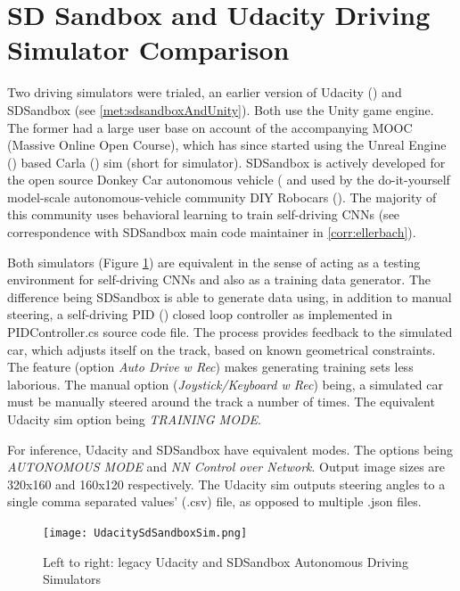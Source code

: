 
\section{SD Sandbox and Udacity Driving Simulator Comparison}

Two driving simulators were trialed, an earlier version of Udacity (\cite{UdacityCarSim}) and SDSandbox (see \ref{met:sdsandboxAndUnity}). Both use the Unity game engine. The former had a large user base on account of the accompanying MOOC (Massive Online Open Course), which has since started using the Unreal Engine (\cite{unrealengine}) based Carla (\cite{Dosovitskiy17}) sim (short for simulator). SDSandbox is actively developed for the open source Donkey Car autonomous vehicle (\cite{DonkeyCar2020} and used by the do-it-yourself model-scale autonomous-vehicle community DIY Robocars (\cite{DIYRobocars2020}). The majority of this community uses behavioral learning to train self-driving CNNs (see correspondence with SDSandbox main code maintainer in \ref{corr:ellerbach}).  
 
Both simulators (Figure \ref{fig:UdacitySdSandboxAutonomous}) are equivalent in the sense of acting as a testing environment for self-driving CNNs and also as a training data generator. The difference being SDSandbox is able to generate data using, in addition to manual steering, a self-driving PID (\cite{bennett1993development}) closed loop controller as implemented in PIDController.cs source code file. The process provides feedback to the simulated car, which adjusts itself on the track, based on known geometrical constraints. The feature (option \textit{Auto Drive w Rec}) makes generating training sets less laborious. The manual option (\textit{Joystick/Keyboard w Rec}) being, a simulated car must be manually steered around the track a number of times. The equivalent Udacity sim option being \textit{TRAINING MODE}.

For inference, Udacity and SDSandbox have equivalent modes. The options being   
\textit{AUTONOMOUS MODE} and \textit{NN Control over Network}. Output image sizes are 320x160 and 160x120 respectively. The Udacity sim outputs steering angles to a single comma separated values' (.csv) file, as opposed to multiple .json files. 

\begin{figure}[h!]
\centering
\texttt{[image: UdacitySdSandboxSim.png]}
\caption{Left to right: legacy Udacity and SDSandbox Autonomous Driving Simulators}
\label{fig:UdacitySdSandboxAutonomous}
\end{figure}

